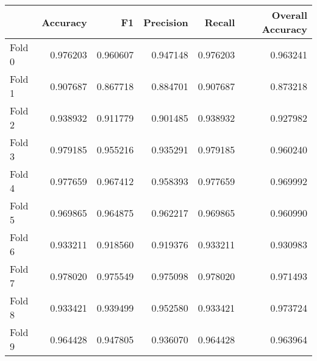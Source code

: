 \begin{tabular}{lrrrrr}
\toprule
{} &  Accuracy &        F1 &  Precision &    Recall &  Overall Accuracy \\
\midrule
Fold 0 &  0.976203 &  0.960607 &   0.947148 &  0.976203 &          0.963241 \\
Fold 1 &  0.907687 &  0.867718 &   0.884701 &  0.907687 &          0.873218 \\
Fold 2 &  0.938932 &  0.911779 &   0.901485 &  0.938932 &          0.927982 \\
Fold 3 &  0.979185 &  0.955216 &   0.935291 &  0.979185 &          0.960240 \\
Fold 4 &  0.977659 &  0.967412 &   0.958393 &  0.977659 &          0.969992 \\
Fold 5 &  0.969865 &  0.964875 &   0.962217 &  0.969865 &          0.960990 \\
Fold 6 &  0.933211 &  0.918560 &   0.919376 &  0.933211 &          0.930983 \\
Fold 7 &  0.978020 &  0.975549 &   0.975098 &  0.978020 &          0.971493 \\
Fold 8 &  0.933421 &  0.939499 &   0.952580 &  0.933421 &          0.973724 \\
Fold 9 &  0.964428 &  0.947805 &   0.936070 &  0.964428 &          0.963964 \\
\bottomrule
\end{tabular}
